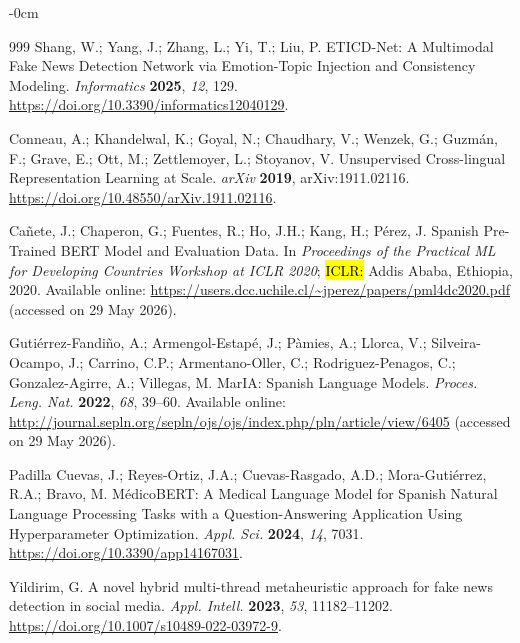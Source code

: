 \documentclass[informatics,article,accept,pdftex,moreauthors]{Definitions/mdpi}
\begin{document}
\begin{adjustwidth}{-\extralength}{0cm}
\begin{thebibliography}{999}
Shang, W.; Yang, J.; Zhang, L.; Yi, T.; Liu, P. ETICD-Net: A Multimodal Fake News Detection Network via Emotion-Topic Injection and Consistency Modeling. \textit{Informatics} \textbf{2025}, \textit{12}, 129. \href{https://doi.org/10.3390/informatics12040129}{https://doi.org/10.3390/informatics12040129}.
 
Conneau, A.; Khandelwal, K.; Goyal, N.; Chaudhary, V.; Wenzek, G.; Guzmán, F.; Grave, E.; Ott, M.; Zettlemoyer, L.; Stoyanov, V. Unsupervised Cross-lingual Representation Learning at Scale. \textit{arXiv} \textbf{2019}, arXiv:1911.02116. \href{https://doi.org/10.48550/arXiv.1911.02116}{https://doi.org/10.48550/arXiv.1911.02116}.
 
Cañete, J.; Chaperon, G.; Fuentes, R.; Ho, J.H.; Kang, H.; Pérez, J. Spanish Pre-Trained BERT Model and Evaluation Data. In \emph{Proceedings of the Practical ML for Developing Countries Workshop at ICLR 2020}; \hl{ICLR:} %
 Addis Ababa, Ethiopia, 2020. Available online: \href{https://users.dcc.uchile.cl/~jperez/papers/pml4dc2020.pdf}{https://users.dcc.uchile.cl/\~{}jperez/papers/pml4dc2020.pdf} (accessed on 29 May 2026).
 
Gutiérrez-Fandiño, A.; Armengol-Estapé, J.; Pàmies, A.; Llorca, V.; Silveira-Ocampo, J.; Carrino, C.P.; Armentano-Oller, C.; Rodriguez-Penagos, C.; Gonzalez-Agirre, A.; Villegas, M. MarIA: Spanish Language Models. \textit{Proces. Leng. Nat.} \textbf{2022}, \textit{68}, 39--60. Available online: \href{http://journal.sepln.org/sepln/ojs/ojs/index.php/pln/article/view/6405}{http://journal.sepln.org/sepln/ojs/ojs/index.php/pln/article/view/6405} (accessed on 29 May 2026).
 
Padilla Cuevas, J.; Reyes-Ortiz, J.A.; Cuevas-Rasgado, A.D.; Mora-Gutiérrez, R.A.; Bravo, M. MédicoBERT: A Medical Language Model for Spanish Natural Language Processing Tasks with a Question-Answering Application Using Hyperparameter Optimization. \textit{Appl. Sci.} \textbf{2024}, \textit{14}, 7031. \href{https://doi.org/10.3390/app14167031}{https://doi.org/10.3390/app14167031}.

Yildirim, G. A novel hybrid multi-thread metaheuristic approach for fake news detection in social media. \textit{Appl. Intell.} \textbf{2023}, \textit{53}, 11182--11202. \href{https://doi.org/10.1007/s10489-022-03972-9}{https://doi.org/10.1007/s10489-022-03972-9}.
 

\end{thebibliography}
\end{adjustwidth}
\end{document}
